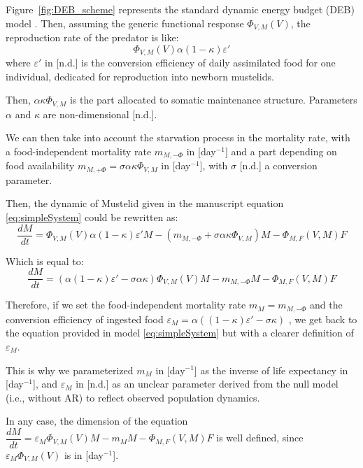 \documentclass[11pt]{article}
\begin{document}
Figure~\ref{fig:DEB_scheme} represents the standard dynamic energy budget (DEB) model \citep{Sousa2010}.
%
Then, assuming the generic functional response $\Phi_{V,M}(V)$, the reproduction rate of the predator is like:
\begin{equation}
\Phi_{V,M}(V) \alpha (1 - \kappa) \varepsilon'
\end{equation}
where $\varepsilon'$ in [n.d.] is the conversion efficiency of daily assimilated food for one individual, dedicated for reproduction into newborn mustelids.

Then, $\alpha \kappa \Phi_{V,M}$ is the part allocated to somatic maintenance structure. Parameters $\alpha$ and $\kappa$ are non-dimensional [n.d.].

We can then take into account the starvation process in the mortality rate, with a food-independent mortality rate $m_{M, -\Phi}$ in [day$^{-1}$] and a part depending on food availability $m_{M, +\Phi} = \sigma \alpha \kappa \Phi_{V,M}$ in [day$^{-1}$], with $\sigma$ [n.d.] a conversion parameter.


Then, the dynamic of Mustelid given in the manuscript equation \eqref{eq:simpleSystem} could be rewritten as:
\begin{equation}
\frac{dM}{dt} = \Phi_{V,M}(V) \alpha (1 - \kappa) \varepsilon' M - \left( m_{M, -\Phi}  + \sigma \alpha \kappa \Phi_{V,M} \right) M - \Phi_{M,F}(V, M) F
\end{equation}

Which is equal to:
\begin{equation}
\frac{dM}{dt} = \left(\alpha (1 - \kappa) \varepsilon' - \sigma \alpha \kappa  \right) \Phi_{V,M}(V)  M - m_{M, -\Phi}  M  - \Phi_{M,F}(V, M) F
\end{equation}

Therefore, if we set  the food-independent mortality rate $m_M = m_{M, -\Phi}$ and the conversion efficiency of ingested food $\varepsilon_M=\alpha ((1 - \kappa) \varepsilon' - \sigma  \kappa ) $ , we get back to the equation provided in model \eqref{eq:simpleSystem} but with a clearer definition of $\varepsilon_M$.

This is why we parameterized $m_M$ in [day$^{-1}$] as the inverse of life expectancy in [day$^{-1}$], and $\varepsilon_M$ in [n.d.] as an unclear parameter derived from the null model (i.e., without AR) to reflect observed population dynamics. 

In any case, the dimension of the equation $\dfrac{dM}{dt}  = \varepsilon_M \Phi_{V,M}(V)M - m_M M - \Phi_{M,F}(V,M)F$ is well defined, since $\varepsilon_M \Phi_{V,M}(V)$ is in [day$^{-1}$].
\end{document}
